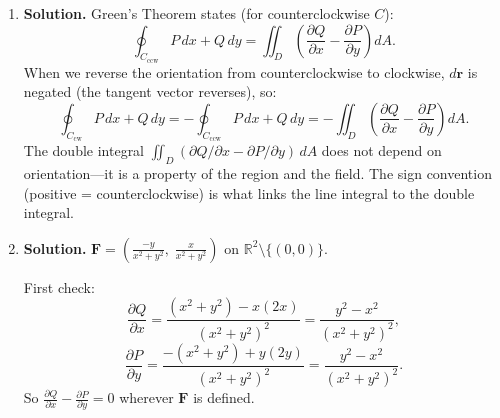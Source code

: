 \begin{enumerate}
For $\iint \cos(2u)\,du\,dv$ over the unit disk, switch to polar: $u=r\cos\theta$:
\[
\int_0^{2\pi}\int_0^1\cos(2r\cos\theta)\,r\,dr\,d\theta = 2\pi\int_0^1 r\,J_0(2r)\,dr,
\]
where $J_0$ is the Bessel function. Using $\frac{d}{dr}[rJ_1(2r)\cdot\frac{1}{2}]=\frac{1}{2}\cdot[J_1(2r)+2rJ_0(2r)\cdot\frac{1}{2}]$... this becomes intricate.

A more direct approach: use the identity $\int_0^1 r J_0(2r)\,dr = \frac{J_1(2)}{2}$, so $\iint\cos(2u)\,du\,dv = 2\pi\cdot\frac{J_1(2)}{2} = \pi J_1(2)$.

For $\iint e^{3v}\,du\,dv$ over the unit disk: $v = r\sin\theta$:
\[
\int_0^{2\pi}\int_0^1 e^{3r\sin\theta}\,r\,dr\,d\theta = 2\pi\int_0^1 r\,I_0(3r)\,dr = 2\pi\cdot\frac{I_1(3)}{3},
\]
using $\int_0^1 r I_0(3r)\,dr = \frac{I_1(3)}{3}$.

Therefore:
\[
\oint_C \mathbf{F}\cdot d\mathbf{r} = 6\left[\pi J_1(2) - \frac{2\pi I_1(3)}{3}\right] = 6\pi J_1(2) - 4\pi I_1(3).
\]

Using $J_1(2)\approx 0.5767$ and $I_1(3)\approx 3.9534$:
\[
\approx 6\pi(0.5767)-4\pi(3.9534) \approx 10.87 - 49.68 \approx \boxed{-38.81}.
\]

\item \textbf{Solution.}
Green's Theorem states (for counterclockwise $C$):
\[
\oint_{C_{\text{ccw}}} P\,dx+Q\,dy = \iint_D\left(\frac{\partial Q}{\partial x}-\frac{\partial P}{\partial y}\right)dA.
\]
When we reverse the orientation from counterclockwise to clockwise, $d\mathbf{r}$ is negated (the tangent vector reverses), so:
\[
\oint_{C_{\text{cw}}} P\,dx+Q\,dy = -\oint_{C_{\text{ccw}}} P\,dx+Q\,dy = -\iint_D\left(\frac{\partial Q}{\partial x}-\frac{\partial P}{\partial y}\right)dA.
\]
The double integral $\iint_D(\partial Q/\partial x - \partial P/\partial y)\,dA$ does not depend on orientation---it is a property of the region and the field. The sign convention (positive = counterclockwise) is what links the line integral to the double integral.

\item \textbf{Solution.}
$\mathbf{F} = \left(\frac{-y}{x^2+y^2},\;\frac{x}{x^2+y^2}\right)$ on $\mathbb{R}^2\setminus\{(0,0)\}$.

First check:
\[
\frac{\partial Q}{\partial x} = \frac{(x^2+y^2)-x(2x)}{(x^2+y^2)^2} = \frac{y^2-x^2}{(x^2+y^2)^2},
\]
\[
\frac{\partial P}{\partial y} = \frac{-(x^2+y^2)+y(2y)}{(x^2+y^2)^2} = \frac{y^2-x^2}{(x^2+y^2)^2}.
\]
So $\frac{\partial Q}{\partial x}-\frac{\partial P}{\partial y}=0$ wherever $\mathbf{F}$ is defined.


\end{enumerate}
